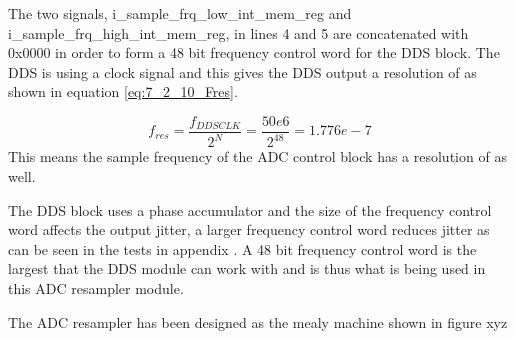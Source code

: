 

The two signals, i\_sample\_frq\_low\_int\_mem\_reg and i\_sample\_frq\_high\_int\_mem\_reg, in lines 4 and 5 are concatenated with 0x0000 in order to form a 48 bit frequency control word for the DDS block. The DDS is using a  clock signal and this gives the DDS output a resolution of  as shown in equation \ref{eq:7_2_10_Fres}.

\begin{equation}\label{eq:7_2_10_Fres}
    f_{res} = \frac{f_{DDSCLK}}{2^N} = \frac{50e6}{2^{48}} = 1.776e-7
\end{equation}
This means the sample frequency of the ADC control block has a resolution of  as well.

The DDS block uses a phase accumulator and the size of the frequency control word affects the output jitter, a larger frequency control word reduces jitter as can be seen in the tests in appendix . A 48 bit frequency control word is the largest that the DDS module can work with and is thus what is being used in this ADC resampler module.

The ADC resampler has been designed as the mealy machine shown in figure xyz




